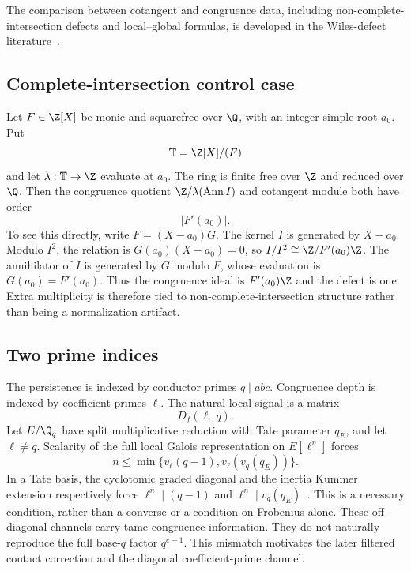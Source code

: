 The comparison between cotangent and congruence data, including non-complete-intersection defects and local--global formulas, is developed in the Wiles-defect literature~\cite{BKM1,BKM2}.

\subsection{Complete-intersection control case}
Let $F\in\Z[X]$ be monic and squarefree over $\Q$, with an integer simple root $a_0$. Put
\[
 \mathbb T=\Z[X]/(F)
\]
and let $\lambda:\mathbb T\to\Z$ evaluate at $a_0$. The ring is finite free over $\Z$ and reduced over $\Q$. Then the congruence quotient $\Z/\lambda(\operatorname{Ann}I)$ and cotangent module both have order
\[
 |F'(a_0)|.
\]
To see this directly, write $F=(X-a_0)G$. The kernel $I$ is generated by $X-a_0$. Modulo $I^2$, the relation is $G(a_0)(X-a_0)=0$, so $I/I^2\cong\Z/F'(a_0)\Z$. The annihilator of $I$ is generated by $G$ modulo $F$, whose evaluation is $G(a_0)=F'(a_0)$. Thus the congruence ideal is $F'(a_0)\Z$ and the defect is one. Extra multiplicity is therefore tied to non-complete-intersection structure rather than being a normalization artifact.

\subsection{Two prime indices}
The persistence is indexed by conductor primes $q\mid abc$. Congruence depth is indexed by coefficient primes $\ell$. The natural local signal is a matrix
\[
 D_f(\ell,q).
\]
Let $E/\Q_q$ have split multiplicative reduction with Tate parameter $q_E$, and let $\ell\ne q$. Scalarity of the full local Galois representation on $E[\ell^n]$ forces
\[
 n\le\min\{v_\ell(q-1),v_\ell(v_q(q_E))\}.
\]
In a Tate basis, the cyclotomic graded diagonal and the inertia Kummer extension respectively force $\ell^n\mid(q-1)$ and $\ell^n\mid v_q(q_E)$~\cite{SerreAbelian1989}. This is a necessary condition, rather than a converse or a condition on Frobenius alone. These off-diagonal channels carry tame congruence information. They do not naturally reproduce the full base-$q$ factor $q^{e-1}$. This mismatch motivates the later filtered contact correction and the diagonal coefficient-prime channel.

